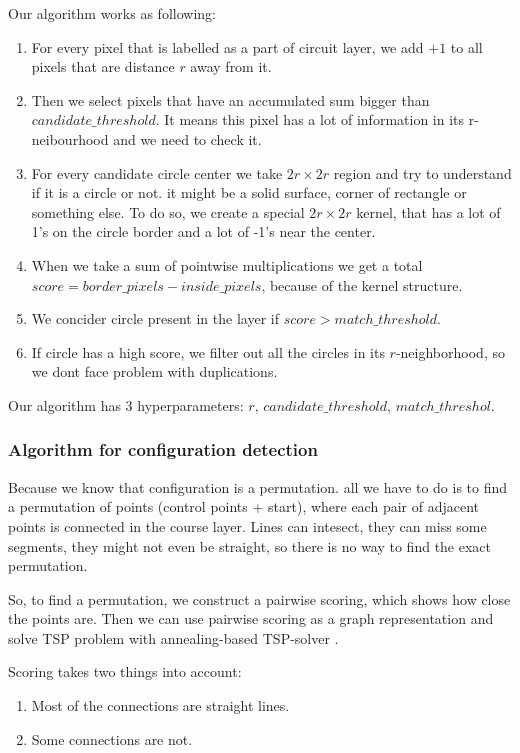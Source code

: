\documentclass[a4paper,12pt]{extarticle}
\begin{document}
Our algorithm works as following:
\begin{enumerate}
    \item For every pixel that is labelled as a part of circuit layer, we add $+1$ to all pixels that are distance $r$ away from it.
    \item Then we select pixels that have an accumulated sum bigger than $candidate\_threshold$. It means this pixel has a lot of information in its r-neibourhood and we need to check it.
    \item For every candidate circle center we take $2r \times 2r$ region and try to understand if it is a circle or not. it might be a solid surface, corner of rectangle or something else. To do so, we create a special $2r \times 2r$ kernel, that has a lot of 1's on the circle border and a lot of -1's near the center.
    \item When we take a sum of pointwise multiplications we get a total $score = border\_pixels - inside\_pixels$, because of the kernel structure.
    \item We concider circle present in the layer if $score > match\_threshold$.
    \item If circle has a high score, we filter out all the circles in its $r$-neighborhood, so we dont face problem with duplications. 
\end{enumerate}

Our algorithm has 3 hyperparameters: $r$, $candidate\_threshold$, $match\_threshol$.

\subsubsection{Algorithm for configuration detection}

Because we know that configuration is a permutation. all we have to do is to find a permutation of points (control points + start), where each pair of adjacent points is connected in the course layer.
Lines can intesect, they can miss some segments, they might not even be straight, so there is no way to find the exact permutation.

So, to find a permutation, we construct a pairwise scoring, which shows how close the points are.
Then we can use pairwise scoring as a graph representation and solve TSP problem \cite{tsp} with annealing-based TSP-solver \cite{tspsolver}.

Scoring takes two things into account:
\begin{enumerate}
    \item Most of the connections are straight lines.
    \item Some connections are not.
\end{enumerate}
\end{document}
